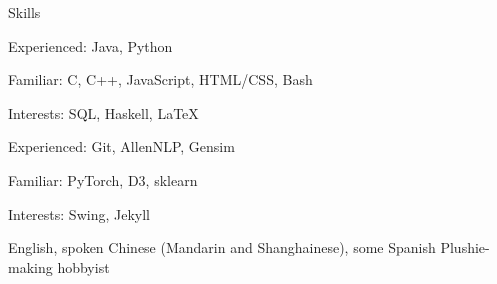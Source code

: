 
\begin{rubric}{Skills}
    \par Experienced: Java, Python
    \par Familiar: C, C++, JavaScript, HTML/CSS, Bash
    \par Interests: SQL, Haskell, \LaTeX
{}
    \par Experienced: Git, AllenNLP, Gensim
    \par Familiar: PyTorch, D3, sklearn
    \par Interests: Swing, Jekyll
    \par English, spoken Chinese (Mandarin and Shanghainese), some Spanish
\entry*[Misc.]
    Plushie-making hobbyist
\end{rubric}
